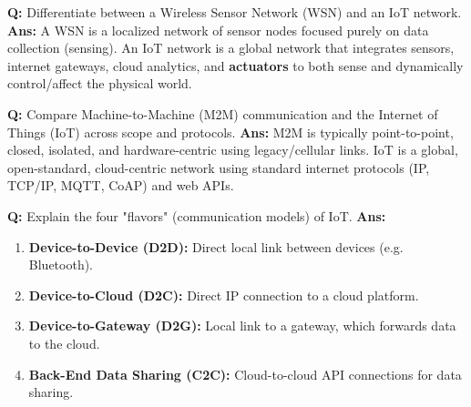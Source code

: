 \documentclass[10pt,a4paper,twocolumn]{article}
\begin{document}
\begin{tcolorbox}[
  colback=white,
  colframe=UnitColorOne,
  colbacktitle=gray!10!white,
  coltitle=black,
  fonttitle=\bfseries\sffamily\small,
  title={Unit I $\bullet$ Card 4},
  boxrule=1.2pt,
  arc=2mm,
  outer arc=2mm,
  boxsep=1.5mm,
  top=1mm,
  bottom=1mm,
  left=1.5mm,
  right=1.5mm,
  before skip=2.5mm,
  after skip=2.5mm
]
\textbf{Q:} Differentiate between a Wireless Sensor Network (WSN) and an IoT network.
\tcbline
\textbf{Ans:} A WSN is a localized network of sensor nodes focused purely on data collection (sensing). An IoT network is a global network that integrates sensors, internet gateways, cloud analytics, and \textbf{actuators} to both sense and dynamically control/affect the physical world.
\end{tcolorbox}


\begin{tcolorbox}[
  colback=white,
  colframe=UnitColorOne,
  colbacktitle=gray!10!white,
  coltitle=black,
  fonttitle=\bfseries\sffamily\small,
  title={Unit I $\bullet$ Card 5},
  boxrule=1.2pt,
  arc=2mm,
  outer arc=2mm,
  boxsep=1.5mm,
  top=1mm,
  bottom=1mm,
  left=1.5mm,
  right=1.5mm,
  before skip=2.5mm,
  after skip=2.5mm
]
\textbf{Q:} Compare Machine-to-Machine (M2M) communication and the Internet of Things (IoT) across scope and protocols.
\tcbline
\textbf{Ans:} M2M is typically point-to-point, closed, isolated, and hardware-centric using legacy/cellular links. IoT is a global, open-standard, cloud-centric network using standard internet protocols (IP, TCP/IP, MQTT, CoAP) and web APIs.
\end{tcolorbox}


\begin{tcolorbox}[
  colback=white,
  colframe=UnitColorOne,
  colbacktitle=gray!10!white,
  coltitle=black,
  fonttitle=\bfseries\sffamily\small,
  title={Unit I $\bullet$ Card 6},
  boxrule=1.2pt,
  arc=2mm,
  outer arc=2mm,
  boxsep=1.5mm,
  top=1mm,
  bottom=1mm,
  left=1.5mm,
  right=1.5mm,
  before skip=2.5mm,
  after skip=2.5mm
]
\textbf{Q:} Explain the four "flavors" (communication models) of IoT.
\tcbline
\textbf{Ans:} \begin{enumerate}
  \item \textbf{Device-to-Device (D2D):} Direct local link between devices (e.g. Bluetooth).
  \item \textbf{Device-to-Cloud (D2C):} Direct IP connection to a cloud platform.
  \item \textbf{Device-to-Gateway (D2G):} Local link to a gateway, which forwards data to the cloud.
  \item \textbf{Back-End Data Sharing (C2C):} Cloud-to-cloud API connections for data sharing.
\end{enumerate}
\end{tcolorbox}
\end{document}
